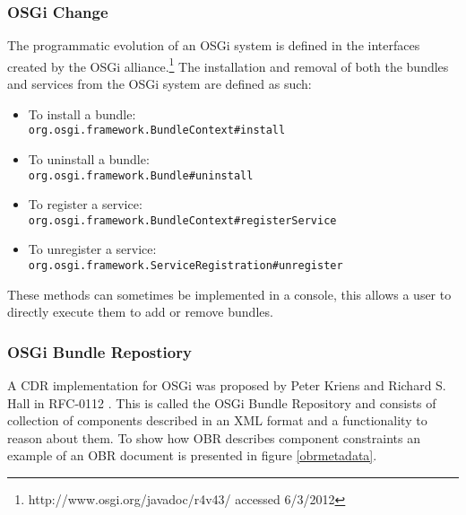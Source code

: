 \subsubsection{OSGi Change}
The programmatic evolution of an OSGi system is defined in the interfaces created by the OSGi alliance.\footnote{http://www.osgi.org/javadoc/r4v43/ accessed 6/3/2012}
The installation and removal of both the bundles and services from the OSGi system are defined as such:
 
\begin{itemize}
  \item To install a bundle:\\ \texttt{org.osgi.framework.BundleContext}\verb+#+\texttt{install}
  \item To uninstall a bundle:\\ \texttt{org.osgi.framework.Bundle}\verb+#+\texttt{uninstall}
  \item To register a service: \\ \texttt{org.osgi.framework.BundleContext}\verb+#+\texttt{registerService}
  \item To unregister a service: \\ \texttt{org.osgi.framework.ServiceRegistration}\verb+#+\texttt{unregister}
\end{itemize}

These methods can sometimes be implemented in a console, this allows a user to directly execute them to add or remove bundles.

\subsubsection{OSGi Bundle Repostiory}
A CDR implementation for OSGi was proposed by Peter Kriens and Richard S. Hall in RFC-0112 \citep{the_osgi_alliance_rfc-0112_2006}.
This is called the OSGi Bundle Repository and consists of collection of components described in an XML format and a functionality to reason about them.
To show how OBR describes component constraints an example of an OBR document is presented in figure \ref{obrmetadata}.

